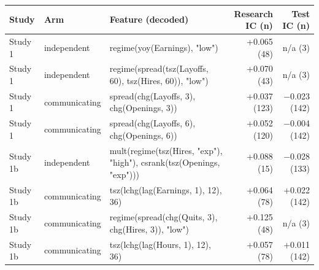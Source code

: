 \begin{tabular}{llp{2.55in}rr}
\toprule
Study & Arm & Feature (decoded) & Research IC (n) & Test IC (n) \\
\midrule
Study 1 & independent & regime(yoy(Earnings), "low") & +0.065 (48) & n/a (3) \\
Study 1 & independent & regime(spread(tsz(Layoffs, 60), tsz(Hires, 60)), "low") & +0.070 (43) & n/a (3) \\
Study 1 & communicating & spread(chg(Layoffs, 3), chg(Openings, 3)) & +0.037 (123) & $-$0.023 (142) \\
Study 1 & communicating & spread(chg(Layoffs, 6), chg(Openings, 6)) & +0.052 (120) & $-$0.004 (142) \\
Study 1b & independent & mult(regime(tsz(Hires, "exp"), "high"), csrank(tsz(Openings, "exp"))) & +0.088 (15) & $-$0.028 (133) \\
Study 1b & communicating & tsz(lchg(lag(Earnings, 1), 12), 36) & +0.064 (78) & +0.022 (142) \\
Study 1b & communicating & regime(spread(chg(Quits, 3), chg(Hires, 3)), "low") & +0.125 (48) & n/a (3) \\
Study 1b & communicating & tsz(lchg(lag(Hours, 1), 12), 36) & +0.057 (78) & +0.011 (142) \\
\bottomrule
\end{tabular}
